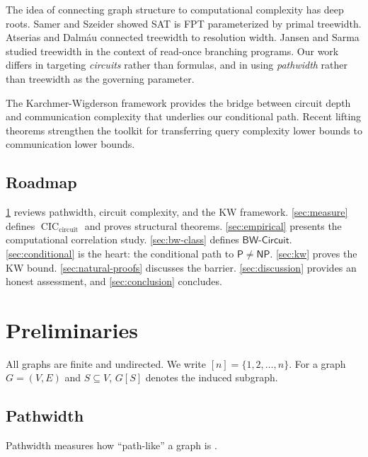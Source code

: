 \documentclass[11pt]{article}
\theoremstyle{plain}
\theoremstyle{definition}
\newcommand{\CIC}{\operatorname{CIC}}
\newcommand{\CICcirc}{\CIC_{\text{circuit}}}
\newcommand{\Pclass}{\mathsf{P}}
\newcommand{\NP}{\mathsf{NP}}
\newcommand{\BWCircuit}{\mathsf{BW\text{-}Circuit}}
\newcommand{\set}[1]{\{#1\}}
\begin{document}
The idea of connecting graph structure to computational complexity has deep roots. Samer and Szeider \cite{SamerSzeider10} showed SAT is FPT parameterized by primal treewidth. Atserias and Dalm\'{a}u \cite{AtseriasDalmu05} connected treewidth to resolution width. Jansen and Sarma \cite{JansenSarma13} studied treewidth in the context of read-once branching programs. Our work differs in targeting \emph{circuits} rather than formulas, and in using \emph{pathwidth} rather than treewidth as the governing parameter.

The Karchmer-Wigderson framework \cite{KarchmerWigderson88} provides the bridge between circuit depth and communication complexity that underlies our conditional path. Recent lifting theorems \cite{GPW18} strengthen the toolkit for transferring query complexity lower bounds to communication lower bounds.

\subsection{Roadmap}

\cref{sec:prelims} reviews pathwidth, circuit complexity, and the KW framework. \cref{sec:measure} defines $\CICcirc$ and proves structural theorems. \cref{sec:empirical} presents the computational correlation study. \cref{sec:bw-class} defines $\BWCircuit$. \cref{sec:conditional} is the heart: the conditional path to $\Pclass \neq \NP$. \cref{sec:kw} proves the KW bound. \cref{sec:natural-proofs} discusses the barrier. \cref{sec:discussion} provides an honest assessment, and \cref{sec:conclusion} concludes.


\section{Preliminaries}\label{sec:prelims}

All graphs are finite and undirected. We write $[n] = \set{1, 2, \ldots, n}$. For a graph $G = (V, E)$ and $S \subseteq V$, $G[S]$ denotes the induced subgraph.

\subsection{Pathwidth}

Pathwidth measures how ``path-like'' a graph is \cite{RobertsonSeymour83}.
\end{document}
